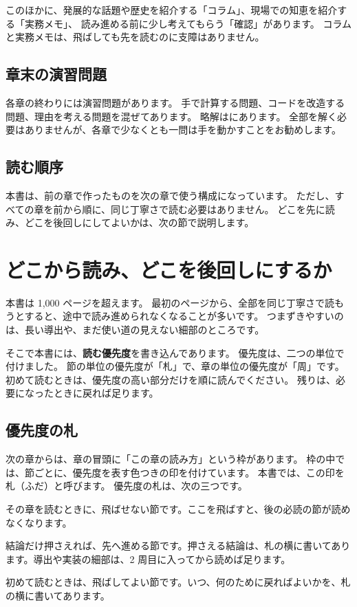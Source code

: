 このほかに、発展的な話題や歴史を紹介する「コラム」、現場での知恵を紹介する「実務メモ」、
読み進める前に少し考えてもらう「確認」があります。
コラムと実務メモは、飛ばしても先を読むのに支障はありません。

\subsection*{章末の演習問題}

各章の終わりには演習問題があります。
手で計算する問題、コードを改造する問題、理由を考える問題を混ぜてあります。
略解はにあります。
全部を解く必要はありませんが、各章で少なくとも一問は手を動かすことをお勧めします。

\subsection*{読む順序}

本書は、前の章で作ったものを次の章で使う構成になっています。
ただし、すべての章を前から順に、同じ丁寧さで読む必要はありません。
どこを先に読み、どこを後回しにしてよいかは、次の節で説明します。

\section{どこから読み、どこを後回しにするか}\label{sec:intro-route}

本書は 1,000 ページを超えます。
最初のページから、全部を同じ丁寧さで読もうとすると、途中で読み進められなくなることが多いです。
つまずきやすいのは、長い導出や、まだ使い道の見えない細部のところです。

そこで本書には、\textbf{読む優先度}を書き込んであります。
優先度は、二つの単位で付けました。
節の単位の優先度が「札」で、章の単位の優先度が「周」です。
初めて読むときは、優先度の高い部分だけを順に読んでください。
残りは、必要になったときに戻れば足ります。

\subsection*{優先度の札}

次の章からは、章の冒頭に「この章の読み方」という枠があります。
枠の中では、節ごとに、優先度を表す色つきの印を付けています。
本書では、この印を札（ふだ）と呼びます。
優先度の札は、次の三つです。

\begin{description}[leftmargin=6.4em,labelwidth=5.6em,labelsep=0.8em,itemsep=1pt,font=\normalfont]
\item[\rgmust] その章を読むときに、飛ばせない節です。ここを飛ばすと、後の必読の節が読めなくなります。
\item[\rgskim] 結論だけ押さえれば、先へ進める節です。押さえる結論は、札の横に書いてあります。導出や実装の細部は、2 周目に入ってから読めば足ります。
\item[\rglater] 初めて読むときは、飛ばしてよい節です。いつ、何のために戻ればよいかを、札の横に書いてあります。
\end{description}

